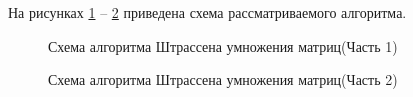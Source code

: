 На рисунках \ref{fig:shtrasen} -- \ref{fig:shtrasen2} приведена схема рассматриваемого алгоритма.
\FloatBarrier
\begin{figure}[h]
	
	\caption{Схема алгоритма Штрассена умножения матриц(Часть 1)}
	\label{fig:shtrasen}
\end{figure}
\FloatBarrier

\FloatBarrier
\begin{figure}[h]
	
	\caption{Схема алгоритма Штрассена умножения матриц(Часть 2)}
	\label{fig:shtrasen2}
\end{figure}
\FloatBarrier


